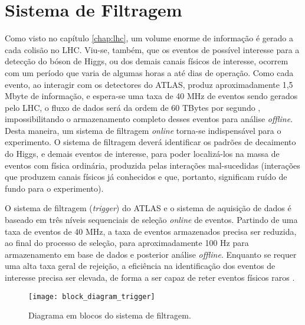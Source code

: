 \chapter{Sistema de Filtragem}
\label{chap:sistema_filtragem}

Como visto no capítulo \ref{chap:lhc}, um volume enorme de informação é gerado a cada colisão no LHC. Viu-se, também, que os eventos de possível interesse para a detecção do bóson de Higgs, ou dos demais canais físicos de interesse, ocorrem com um período que varia de algumas horas a até dias de operação. Como cada evento, ao interagir com os detectores do ATLAS, produz aproximadamente 1,5 Mbyte de informação, e espera-se uma taxa de 40 MHz de eventos sendo gerados pelo LHC, o fluxo de dados será da ordem de 60 TBytes por segundo \cite{bib:tdaq_tdr}, impossibilitando o armazenamento completo desses eventos para análise \emph{offline}. Desta maneira, um sistema de filtragem \emph{online} \cite{bib:real_time_processing} torna-se indispensável para o experimento. O sistema de filtragem deverá identificar os padrões de decaimento do Higgs, e demais eventos de interesse, para poder localizá-los na massa de eventos com física ordinária, produzida pelas interações mal-sucedidas (interações que produzem canais físicos já conhecidos e que, portanto, significam ruído de fundo para o experimento).

O sistema de filtragem (\emph{trigger}) do ATLAS e o sistema de aquisição de dados é baseado em três níveis sequenciais de seleção \emph{online} de eventos. Partindo de uma taxa de eventos de 40 MHz, a taxa de eventos armazenados precisa ser reduzida, ao final do processo de seleção, para aproximadamente 100 Hz para armazenamento em base de dados e posterior análise \emph{offline}. Enquanto se requer uma alta taxa geral de rejeição, a eficiência na identificação dos eventos de interesse precisa ser elevada, de forma a ser capaz de reter eventos físicos raros \cite{bib:lvl1_trigger_tdr}.

\begin{figure}
\begin{center}
\texttt{[image: block\_diagram\_trigger]}
\caption{Diagrama em blocos do sistema de filtragem.}
\label{fig:block_diagram_trigger}
\end{center}
\end{figure}

